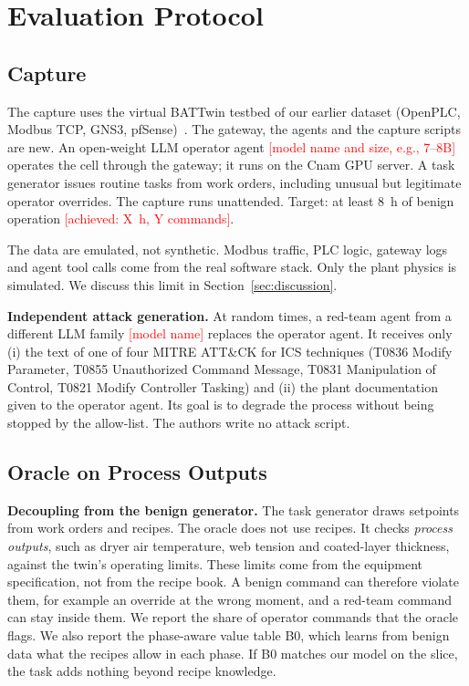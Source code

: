 \documentclass[journal]{IEEEtran}
\newcommand{\billal}[1]{\textcolor{red}{#1}}
\begin{document}
\section{Evaluation Protocol}\label{sec:setup}
\subsection{Capture}\label{sec:data}
The capture uses the virtual BATTwin testbed of our earlier dataset (OpenPLC, Modbus TCP, GNS3, pfSense)~\cite{mokhtari2026cybattics}. The gateway, the agents and the capture scripts are new. An open-weight LLM operator agent \billal{[model name and size, e.g., 7--8B]} operates the cell through the gateway; it runs on the Cnam GPU server. A task generator issues routine tasks from work orders, including unusual but legitimate operator overrides. The capture runs unattended. Target: at least 8~h of benign operation \billal{[achieved: X~h, Y commands]}.

The data are emulated, not synthetic. Modbus traffic, PLC logic, gateway logs and agent tool calls come from the real software stack. Only the plant physics is simulated. We discuss this limit in Section~\ref{sec:discussion}.

\textbf{Independent attack generation.} At random times, a red-team agent from a different LLM family \billal{[model name]} replaces the operator agent. It receives only (i) the text of one of four MITRE ATT\&CK for ICS techniques (T0836 Modify Parameter, T0855 Unauthorized Command Message, T0831 Manipulation of Control, T0821 Modify Controller Tasking) and (ii) the plant documentation given to the operator agent. Its goal is to degrade the process without being stopped by the allow-list. The authors write no attack script.

\subsection{Oracle on Process Outputs}\label{sec:oracle}
\textbf{Decoupling from the benign generator.} The task generator draws setpoints from work orders and recipes. The oracle does not use recipes. It checks \emph{process outputs}, such as dryer air temperature, web tension and coated-layer thickness, against the twin's operating limits. These limits come from the equipment specification, not from the recipe book. A benign command can therefore violate them, for example an override at the wrong moment, and a red-team command can stay inside them. We report the share of operator commands that the oracle flags. We also report the phase-aware value table B0, which learns from benign data what the recipes allow in each phase. If B0 matches our model on the slice, the task adds nothing beyond recipe knowledge.
\end{document}
